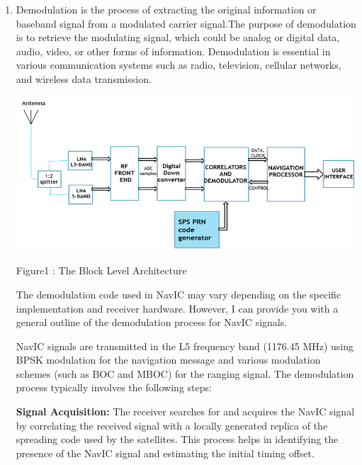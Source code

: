 \documentclass[10pt, onecolumn]{article}
\title{\mytitle}
\author{\myauthor\hspace{1em}\\\contact\\FWC22098 -\hspace{0.5em}IITH\hspace{0.5em}\mymodule\hspace{6em}}
\begin{document}
\maketitle
\begin{enumerate}
\section{what is Demodulation}
\item[\textbf{}] 
Demodulation is the process of extracting the original information or baseband signal from a modulated carrier signal.The purpose of demodulation is to retrieve the modulating signal, which could be analog or digital data, audio, video, or other forms of information. Demodulation is essential in various communication systems such as radio, television, cellular networks, and wireless data transmission.

\includegraphics[width=\linewidth]{./figures/dm.png}
\begin{center}
Figure1 : The Block Level Architecture
\end{center}

The demodulation code used in NavIC may vary depending on the specific implementation and receiver hardware. However, I can provide you with a general outline of the demodulation process for NavIC signals.

NavIC signals are transmitted in the L5 frequency band (1176.45 MHz) using BPSK modulation for the navigation message and various modulation schemes (such as BOC and MBOC) for the ranging signal. The demodulation process typically involves the following steps:

\textbf{Signal Acquisition:} The receiver searches for and acquires the NavIC signal by correlating the received signal with a locally generated replica of the spreading code used by the satellites. This process helps in identifying the presence of the NavIC signal and estimating the initial timing offset.


\end{enumerate}
\end{document}
